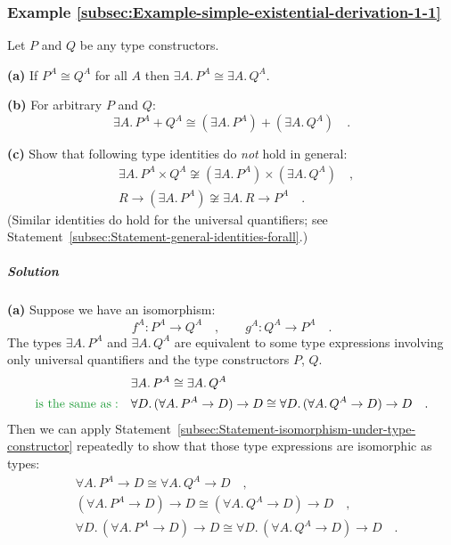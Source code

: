 \subsubsection{Example \label{subsec:Example-simple-existential-derivation-1-1}\ref{subsec:Example-simple-existential-derivation-1-1}}

Let $P$ and $Q$ be any type constructors.

\textbf{(a)} If $P^{A}\cong Q^{A}$ for all $A$ then $\exists A.\,P^{A}\cong\exists A.\,Q^{A}$.

\textbf{(b)} For arbitrary $P$ and $Q$: 
\[
\exists A.\,P^{A}+Q^{A}\cong(\exists A.\,P^{A})+(\exists A.\,Q^{A})\quad.
\]

\textbf{(c)} Show that following type identities do \emph{not} hold
in general:
\begin{align*}
 & \exists A.\,P^{A}\times Q^{A}\not\cong(\exists A.\,P^{A})\times(\exists A.\,Q^{A})\quad,\\
 & R\rightarrow(\exists A.\,P^{A})\not\cong\exists A.\,R\rightarrow P^{A}\quad.
\end{align*}
(Similar identities do hold for the universal quantifiers; see Statement~\ref{subsec:Statement-general-identities-forall}.)

\subparagraph{Solution}

\textbf{(a)} Suppose we have an isomorphism:
\[
f^{A}:P^{A}\rightarrow Q^{A}\quad,\quad\quad g^{A}:Q^{A}\rightarrow P^{A}\quad.
\]
The types $\exists A.\,P^{A}$ and $\exists A.\,Q^{A}$ are equivalent
to some type expressions involving only universal quantifiers and
the type constructors $P$, $Q$.
\begin{align*}
 & \exists A.\,P^{A}\cong\exists A.\,Q^{A}\\
{\color{greenunder}\text{is the same as}:}\quad & \forall D.\,(\forall A.\,P^{A}\rightarrow D)\rightarrow D\cong\forall D.\,(\forall A.\,Q^{A}\rightarrow D)\rightarrow D\quad.
\end{align*}
Then we can apply Statement~\ref{subsec:Statement-isomorphism-under-type-constructor}
repeatedly to show that those type expressions are isomorphic as types:
\begin{align*}
 & \forall A.\,P^{A}\rightarrow D\cong\forall A.\,Q^{A}\rightarrow D\quad,\\
 & (\forall A.\,P^{A}\rightarrow D)\rightarrow D\cong(\forall A.\,Q^{A}\rightarrow D)\rightarrow D\quad,\\
 & \forall D.\,(\forall A.\,P^{A}\rightarrow D)\rightarrow D\cong\forall D.\,(\forall A.\,Q^{A}\rightarrow D)\rightarrow D\quad.
\end{align*}

